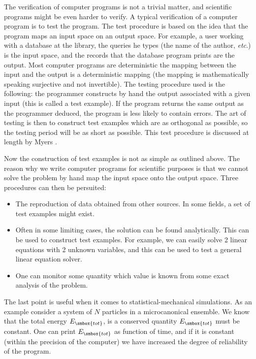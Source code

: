 The verification of computer programs is not a trivial matter, and
scientific programs might be even harder to verify. A typical
verification of a computer program is to test the program. The test
procedure is based on the idea that the program maps an input space
on an output space. For example, a user working with a database
at the library, the queries he types (the name of the author,
\textit{etc}.) is the input space, and the records that the database program
prints are the output. Most computer programs are deterministic \ie the
mapping between the input and the output is a deterministic mapping (the
mapping is mathematically speaking surjective and not invertible). The
testing procedure used is the following: the programmer constructs by
hand the output associated with a given input (this is called a test
example). If the program returns the same output as the programmer
deduced, the program is less likely to contain errors. The art of
testing is then to construct test examples which are as orthogonal as
possible, so the testing period will be as short as possible. This test
procedure is discussed at length by Myers \cite{Myers84}.

Now the construction of test examples is not as simple as outlined
above. The reason why we write computer programs for scientific
purposes is that we cannot solve the problem by hand \ie map the
input space onto the output space. Three procedures
can then be persuited: 

\begin{itemize}
  \item The reproduction of data obtained from other sources. In
    some fields, a set of test examples might exist.
  \item Often in some limiting cases, the solution can be found
    analytically. This can be used to construct test
    examples. For example, we can easily solve 2 linear equations with
    2 unknown variables, and this can be used to test a general linear
    equation solver.
  \item One can monitor some quantity which value is known from some
    exact analysis of the problem.
\end{itemize}

The last point is useful when it comes to
statistical-mechanical simulations. As an example consider a system of
$N$ particles in a microcanonical ensemble. We know that the total
energy $E_{\smbox{tot}}$, is a conserved quantity \ie
$E_{\smbox{tot}}$ must be constant. One can 
print $E_{\smbox{tot}}$ as function of time, and if it is constant
(within the precision of the computer) we have increased the degree of
reliability of the program.


